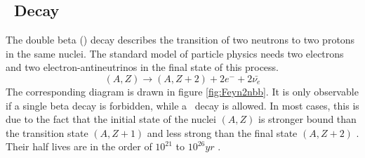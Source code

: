 \documentclass[encoding=utf8,british]{tumphthesis}
\begin{document}



\subsection{\onbb\ Decay}
\label{sec:0nubetabeta}

The double beta (\twonu) decay describes the transition of two neutrons to two protons in the same nuclei.
The standard model of particle physics needs two electrons and two electron-antineutrinos in the final state of this process.
\begin{equation}
(A,Z) \rightarrow (A,Z+2) + 2e^- + 2\bar{\nu_e}
\end{equation} 
The corresponding diagram is drawn in figure \ref{fig:Feyn2nbb}.
It is only observable if a single beta decay is forbidden, while a \twonu\ decay is allowed.
In most cases, this is due to the fact that the initial state of the nuclei $(A,Z)$ is stronger bound than the transition state $(A,Z+1)$ and less strong than the final state $(A,Z+2)$ .
Their half lives are in the order of $10^{21}$ to $10^{26} \unit{yr}$ \cite{shirai_double_2018,barabash_brief_2017}.
\\
\end{document}
